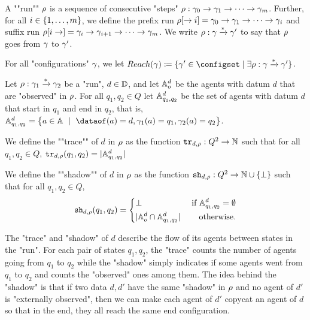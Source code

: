 A ""run"" $\rho$ is a sequence of consecutive "steps" $\rho: \gamma_0 \to \gamma_1 \to \cdots \to  \gamma_m$.
Further, for all $i \in \{1,\dots,m\}$, we define the prefix run $\rho[\to i] = \gamma_0 \to \gamma_1 \to \cdots \to  \gamma_i$ and suffix run $\rho[i \to] = \gamma_i \to \gamma_{i+1} \to \cdots \to  \gamma_m$. We write $\rho : \gamma \xrightarrow{*} \gamma'$ to say that $\rho$ goes from $\gamma$ to $\gamma'$.

For all "configurations" $\gamma$, we let $\Reach(\config) \coloneqq \set{\config' \in \configset \mid \exists \run : \config \xrightarrow{*} \config'}$.


\begin{definition}
	Let $\rho : \gamma_1 \xrightarrow{*} \gamma_2$ be a "run", $d\in \mathbb{D}$, and let $\mathbb{A}^d_o$ be the agents with datum $d$ that are "observed" in $\rho$. For all $q_1, q_2 \in Q$ let $\mathbb{A}^d_{q_1, q_2}$ be the set of agents with datum $d$ that start in $q_1$ and end in $q_2$, that is, $\Agentset^d_{q_1, q_2} = \bigl\{a \in \Agentset \ \mid \ \dataof(a) = d, \config_1(a) = q_1, \config_2(a) = q_2\bigr\}$.
	
	We define the ""trace"" of $d$ in $\rho$ as the function $\mathtt{tr}_{d,\rho} : Q^2 \to \mathbb{N}$ such that for all $q_1, q_2 \in Q$,	$\mathtt{tr}_{d,\rho}(q_1, q_2) = |\mathbb{A}^d_{q_1, q_2}|$
		
	
	\AP We define the ""shadow"" of $d$ in $\rho$ as the function $\mathtt{sh}_{d,\rho} : Q^2 \to \mathbb{N} \cup \{\bot\}$ such that for all $q_1, q_2 \in Q$,
	\begin{equation}
		\mathtt{sh}_{d,\rho}(q_1, q_2) =
		\left\{
		\begin{aligned}
			&\bot &\text{ if } \mathbb{A}^d_{q_1,q_2} =\emptyset\\
			&|\mathbb{A}^d_o \cap \mathbb{A}^d_{q_1, q_2}| &\text{ otherwise.}
		\end{aligned}
		\right.
	\end{equation}
\end{definition}
%	
The "trace" and "shadow" of $d$ describe the flow of its agents between states in the "run". For each pair of states $q_1, q_2$, the "trace" counts the number of agents going from $q_1$ to $q_2$ while
the "shadow" simply indicates if some agents went from $q_1$ to $q_2$ and counts the "observed" ones among them. The idea behind the "shadow" is that if two data $d, d'$ have the same "shadow" in $\rho$ and no agent of $d'$ is "externally observed", then we can make each agent of $d'$ copycat an agent of $d$ so that in the end, they all reach the same end configuration.


